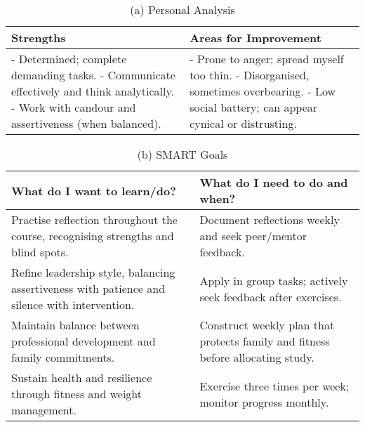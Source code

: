 \begin{landscape}
	\begin{table}[htbp]
		\centering
		\renewcommand{\arraystretch}{1.3}
		\begin{tabular}{|p{9cm}|p{9cm}|}
			\hline
			\textbf{Strengths} & \textbf{Areas for Improvement} \\ \hline
			- Determined; complete demanding tasks. \newline
			- Communicate effectively and think analytically. \newline
			- Work with candour and assertiveness (when balanced). &
			- Prone to anger; spread myself too thin. \newline
			- Disorganised, sometimes overbearing. \newline
			- Low social battery; can appear cynical or distrusting. \\ \hline
		\end{tabular}
		\caption{(a) Personal Analysis}
	\end{table}
	
	\begin{table}[htbp]
		\centering
		\renewcommand{\arraystretch}{1.3}
		\begin{tabular}{|p{9cm}|p{9cm}|}
			\hline
			\textbf{What do I want to learn/do?} & \textbf{What do I need to do and when?} \\ \hline
			
			Practise reflection throughout the course, recognising strengths and blind spots. & 
			Document reflections weekly and seek peer/mentor feedback. \\ \hline
			
			Refine leadership style, balancing assertiveness with patience and silence with intervention. & 
			Apply in group tasks; actively seek feedback after exercises. \\ \hline
			
			Maintain balance between professional development and family commitments. & 
			Construct weekly plan that protects family and fitness before allocating study. \\ \hline
			
			Sustain health and resilience through fitness and weight management. & 
			Exercise three times per week; monitor progress monthly. \\ \hline
			
		\end{tabular}
		\caption{(b) SMART Goals}
	\end{table}
\end{landscape}

